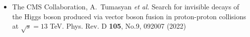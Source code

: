 \begin{itemize}
    \item The CMS Collaboration, A.~Tumasyan \textit{et al.} 
    Search for invisible decays of the Higgs boson produced via 
    vector boson fusion in proton-proton collisions at $\sqrt{s} = 13$
    TeV. Phys. Rev. D \textbf{105}, No.9, 092007 (2022)
\end{itemize}


	      


	      

